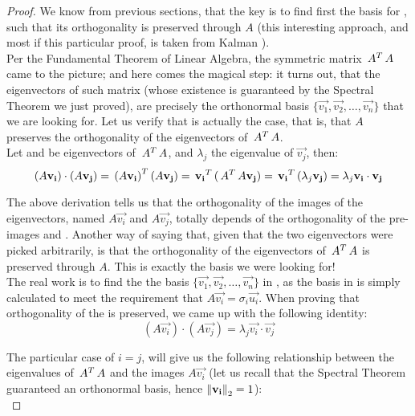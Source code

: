 \begin{proof}
We know from previous sections, that
the key is to find first the 
basis for , such that its orthogonality is preserved through
$A$ (this interesting approach, and most if this particular proof, is taken from
Kalman \cite{kalman96}). \\

Per the Fundamental
Theorem of Linear Algebra, the symmetric 
matrix $\,{A}^{T}\,A$ came to 
the picture; and here comes the magical step: it turns out, that the
eigenvectors of such matrix (whose existence is guaranteed by the
Spectral Theorem we just proved), are precisely the orthonormal basis
$\{\vec{v_1},\vec{v_2},\dots,\vec{v_n}\}$ that we are looking for. Let
us verify that is actually the case, that is, that $A$ preserves the
orthogonality of the eigenvectors of $\,{A}^{T}\,A$. \\

Let  and  be eigenvectors of $\,{A}^{T}\,A$, and
$\lambda_j$ the eigenvalue of $\vec{v_j}$, then: \\

\[
(A\mathbf{v_i}) \cdot (A\mathbf{v_j}) = 
\,{(A\mathbf{v_i})}^{T}\,(A\mathbf{v_j}) = 
\,{\mathbf{v_i}}^{T}\, (\,{A}^{T}\, A\mathbf{v_j}) = 
\,{\mathbf{v_i}}^{T}\, ( \lambda_j \mathbf{v_j} ) = 
\lambda_j \mathbf{v_i} \cdot \mathbf{v_j}
\]
\hfill

The above derivation tells us that the orthogonality of the images of
the eigenvectors, named $A\vec{v_i}$ and $A\vec{v_j}$, totally depends of the
orthogonality of the pre-images  and . Another way of
saying that, given that the two eigenvectors were picked arbitrarily,
is that the orthogonality of the eigenvectors of $\,{A}^{T}\,A$ is
preserved through $A$. This is exactly the basis we were looking for!
\\ 

The real work is to find the the basis
$\{\vec{v_1},\vec{v_2},\dots,\vec{v_n}\}$ in , as the basis in  is
simply calculated to meet the requirement that $A\vec{v_i} =
\sigma_i\vec{u_i}$. When proving that orthogonality of the
 is preserved, we came up with the following identity: \\

\[
(A\vec{v_i}) \cdot (A\vec{v_j}) =  \lambda_j \vec{v_i} \cdot \vec{v_j}
\]
\hfill

The particular case of $i = j$, will give us the following
relationship between the eigenvalues of $\,{A}^{T}\,A$ and the images
$A\vec{v_i}$ (let us recall that the Spectral Theorem guaranteed an
orthonormal basis, hence $\left\lVert \mathbf{v_i} \right\rVert_2 = 1$): \\


\end{proof}
